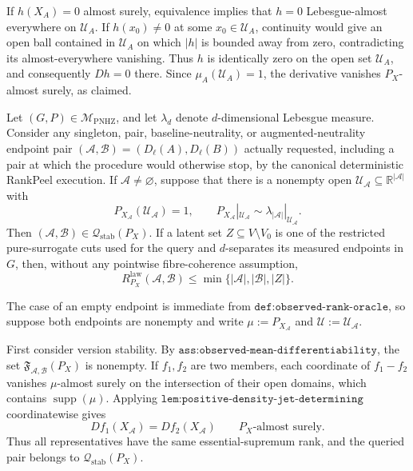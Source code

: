 If \(h(X_A)=0\) almost surely, equivalence implies that \(h=0\) Lebesgue-almost everywhere on \(\mathcal U_A\).  If \(h(x_0)\neq0\) at some \(x_0\in\mathcal U_A\), continuity would give an open ball contained in \(\mathcal U_A\) on which \(|h|\) is bounded away from zero, contradicting its almost-everywhere vanishing.  Thus \(h\) is identically zero on the open set \(\mathcal U_A\), and consequently \(Dh=0\) there.  Since \(\mu_A(\mathcal U_A)=1\), the derivative vanishes \(P_X\)-almost surely, as claimed.

Let \((G,P)\in\mathcal M_{\mathrm{PNHZ}}\), and let \(\lambda_d\) denote \(d\)-dimensional Lebesgue measure.  Consider any singleton, pair, baseline-neutrality, or augmented-neutrality endpoint pair \((\mathcal A,\mathcal B)=(D_\ell(A),D_\ell(B))\) actually requested, including a pair at which the procedure would otherwise stop, by the canonical deterministic RankPeel execution.  If \(\mathcal A\neq\varnothing\), suppose that there is a nonempty open \(\mathcal U_{\mathcal A}\subseteq\mathbb R^{|\mathcal A|}\) with
\[
 P_{X_{\mathcal A}}(\mathcal U_{\mathcal A})=1,
 \qquad
 P_{X_{\mathcal A}}|_{\mathcal U_{\mathcal A}}
 \sim \lambda_{|\mathcal A|}|_{\mathcal U_{\mathcal A}}.
\]
Then \((\mathcal A,\mathcal B)\in\mathcal Q_{\mathrm{stab}}(P_X)\).  If a latent set \(Z\subseteq V\setminus V_0\) is one of the restricted pure-surrogate cuts used for the query and \(d\)-separates its measured endpoints in \(G\), then, without any pointwise fibre-coherence assumption,
\[
 R^{\mathrm{law}}_{P_X}(\mathcal A,\mathcal B)
 \leq\min\{|\mathcal A|,|\mathcal B|,|Z|\}.
\]

The case of an empty endpoint is immediate from \(\texttt{def:observed-rank-oracle}\), so suppose both endpoints are nonempty and write \(\mu:=P_{X_{\mathcal A}}\) and \(\mathcal U:=\mathcal U_{\mathcal A}\).

First consider version stability.  By \(\texttt{ass:observed-mean-differentiability}\), the set \(\mathfrak F_{\mathcal A,\mathcal B}(P_X)\) is nonempty.  If \(f_1,f_2\) are two members, each coordinate of \(f_1-f_2\) vanishes \(\mu\)-almost surely on the intersection of their open domains, which contains \(\operatorname{supp}(\mu)\).  Applying \(\texttt{lem:positive-density-jet-determining}\) coordinatewise gives
\[
 Df_1(X_{\mathcal A})=Df_2(X_{\mathcal A})
 \qquad P_X\text{-almost surely}. \tag{1}
\]
Thus all representatives have the same essential-supremum rank, and the queried pair belongs to \(\mathcal Q_{\mathrm{stab}}(P_X)\).

